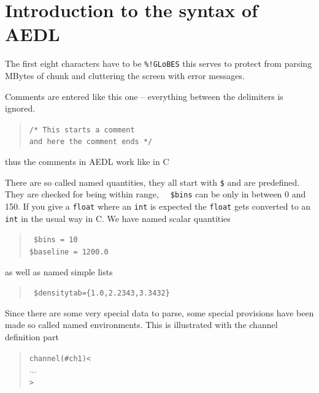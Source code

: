 \section{Introduction to the syntax of AEDL}
\label{sec:syntax}

 The first eight characters have to be {\tt \%!GLoBES} 
 this serves to protect from parsing MBytes of chunk
 and cluttering the screen with error messages. 

Comments
 are entered like this one -- everything between the 
 delimiters is ignored. 
\begin{quote}
{\tt /* This starts a comment\\
 and here the comment ends */
}
\end{quote}
thus the comments in AEDL work like in C

There are so called  named quantities, they all start with {\tt \$} 
and are predefined. They are checked for being within range, \eg\ {\tt 
\$bins} can be only in between 0 and 150. If you give a {\tt float} where
 an {\tt int} is expected the {\tt float} gets converted to an {\tt int} 
in the usual way in C.  We have named scalar quantities
\begin{quote}
{\tt
\$bins = 10\\
\$baseline = 1200.0
}
\end{quote}
as well as named simple lists
\begin{quote}
{\tt
\$densitytab=\{1.0,2.2343,3.3432\}
}
\end{quote}

Since there are some very special data to parse, some special
provisions have been made so called named environments. This is illustrated 
with the channel definition part
\begin{quote}
{\tt channel(\#ch1)<\\
\tb  $\ldots$\\
>
}
\end{quote}

